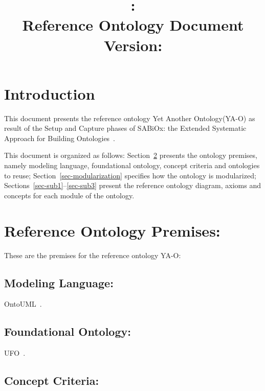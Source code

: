 \documentclass[table,usenames,dvipsnames]{article}
\title{\ontologyacronym: \ontologyname
	\\{\large Reference Ontology Document}
	\\{\normalsize Version: \documentversion}}
\author{\authorname}
\newcommand{\sabiox}{SABiOx\xspace}
\newcommand{\sabioxfull}{Extended Systematic Approach for Building Ontologies\xspace}
\newcommand{\ontologyacronym}{YA-O\xspace}
\newcommand{\ontologyname}{Yet Another Ontology\xspace}
\begin{document}
\maketitle


\section{Introduction}

This document presents the reference ontology \ontologyname (\ontologyacronym) as result of the Setup and Capture phases of \sabiox: the \sabioxfull~\cite{aguiar-souza:report24}.

This document is organized as follows:
	Section~\ref{sec-premises} presents the ontology premises, namely modeling language, foundational ontology, concept criteria and ontologies to reuse;
	Section~\ref{sec-modularization} specifies how the ontology is modularized;
	Sections~\ref{sec-sub1}--\ref{sec-sub3} present the reference ontology diagram, axioms and concepts for each module of the ontology.


\section{Reference Ontology Premises:}
\label{sec-premises}

These are the premises for the reference ontology \ontologyacronym:


\subsection{Modeling Language:}
\label{sec-premises-language}

OntoUML~\cite{guizzardi-et-al:er18}.



\subsection{Foundational Ontology:}
\label{sec-premises-foundational}

UFO~\cite{guizzardi-et-al:aoj22}.



\subsection{Concept Criteria:}
\label{sec-premises-criteria}

\renewcommand*\thecrcount{CR-\arabic{crcount}}
\newcommand*\CR{\refstepcounter{crcount}\thecrcount}
\setcounter{crcount}{0}
\end{document}
